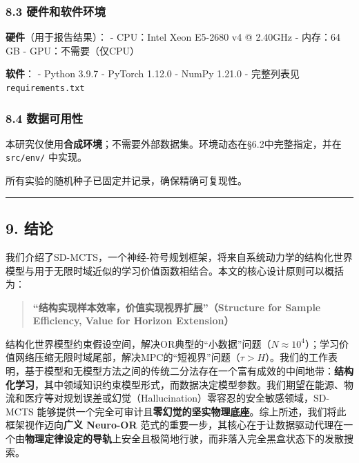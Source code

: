 \documentclass[UTF8]{ctexart}
\begin{document}
\hypertarget{ux786cux4ef6ux548cux8f6fux4ef6ux73afux5883}{%
\subsubsection{8.3
硬件和软件环境}\label{ux786cux4ef6ux548cux8f6fux4ef6ux73afux5883}}

\textbf{硬件}（用于报告结果）： - CPU：Intel Xeon E5-2680 v4 @ 2.40GHz -
内存：64 GB - GPU：不需要（仅CPU）

\textbf{软件}： - Python 3.9.7 - PyTorch 1.12.0 - NumPy 1.21.0 -
完整列表见 \texttt{requirements.txt}

\hypertarget{ux6570ux636eux53efux7528ux6027}{%
\subsubsection{8.4 数据可用性}\label{ux6570ux636eux53efux7528ux6027}}

本研究仅使用\textbf{合成环境}；不需要外部数据集。环境动态在§6.2中完整指定，并在
\texttt{src/env/} 中实现。

所有实验的随机种子已固定并记录，确保精确可复现性。

\begin{center}\rule{0.5\linewidth}{0.4pt}\end{center}

\hypertarget{ux7ed3ux8bba}{%
\subsection{9. 结论}\label{ux7ed3ux8bba}}

我们介绍了SD-MCTS，一个神经-符号规划框架，将来自系统动力学的结构化世界模型与用于无限时域近似的学习价值函数相结合。本文的核心设计原则可以概括为：

\begin{quote}
\textbf{``结构实现样本效率，价值实现视界扩展''（Structure for Sample
Efficiency, Value for Horizon Extension）}
\end{quote}

结构化世界模型约束假设空间，解决OR典型的``小数据''问题（\(N \approx 10^4\)）；学习价值网络压缩无限时域尾部，解决MPC的``短视界''问题（\(\tau > H\)）。我们的工作表明，基于模型和无模型方法之间的传统二分法存在一个富有成效的中间地带：\textbf{结构化学习}，其中领域知识约束模型形式，而数据决定模型参数。我们期望在能源、物流和医疗等对规划误差或幻觉（Hallucination）零容忍的安全敏感领域，SD-MCTS 能够提供一个完全可审计且\textbf{零幻觉的坚实物理底座}。综上所述，我们将此框架视作迈向\textbf{广义 Neuro-OR} 范式的重要一步，其核心在于让数据驱动代理在一个由\textbf{物理定律设定的导轨}上安全且极简地行驶，而非落入完全黑盒状态下的发散搜索。
\end{document}
